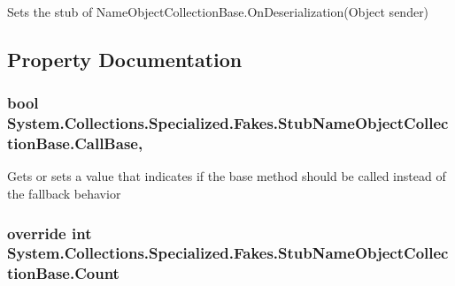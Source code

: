 Sets the stub of Name\-Object\-Collection\-Base.\-On\-Deserialization(\-Object sender)



\subsection{Property Documentation}
\hypertarget{class_system_1_1_collections_1_1_specialized_1_1_fakes_1_1_stub_name_object_collection_base_a233a4a43898405ddcfc6598dec99a776}{
\subsubsection[{Call\-Base}]{\setlength{\rightskip}{0pt plus 5cm}bool System.\-Collections.\-Specialized.\-Fakes.\-Stub\-Name\-Object\-Collection\-Base.\-Call\-Base\hspace{0.3cm}{\ttfamily [get]}, {\ttfamily [set]}}}\label{class_system_1_1_collections_1_1_specialized_1_1_fakes_1_1_stub_name_object_collection_base_a233a4a43898405ddcfc6598dec99a776}


Gets or sets a value that indicates if the base method should be called instead of the fallback behavior

\hypertarget{class_system_1_1_collections_1_1_specialized_1_1_fakes_1_1_stub_name_object_collection_base_aace206c6a2391670a3dbbaf83717e4ae}{
\subsubsection[{Count}]{\setlength{\rightskip}{0pt plus 5cm}override int System.\-Collections.\-Specialized.\-Fakes.\-Stub\-Name\-Object\-Collection\-Base.\-Count\hspace{0.3cm}{\ttfamily [get]}}}\label{class_system_1_1_collections_1_1_specialized_1_1_fakes_1_1_stub_name_object_collection_base_aace206c6a2391670a3dbbaf83717e4ae}


